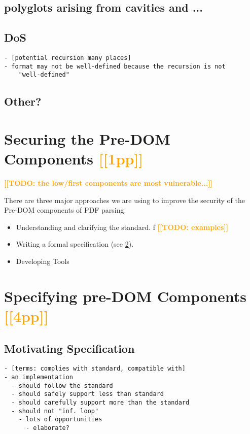 \documentclass[conference,10pt]{IEEEtran}
\newcommand{\note}[1]{\noteYes{#1}}
\newcommand{\noteYes}[1]{\textbf{\textcolor{orange}{[[#1]]}}}
\newcommand{\todo}[1]{\note{TODO: #1}}
\begin{document}
\subsection{polyglots arising from cavities and ...}
\subsection{DoS}
\begin{lstlisting}
- [potential recursion many places]
- format may not be well-defined because the recursion is not
    "well-defined"
\end{lstlisting}

\subsection{Other?}

\section{Securing the Pre-DOM Components \note{1pp}}
\label{sec:securing}

\todo{the low/first components are most vulnerable...}
     
There are three major approaches we are using to improve the security of the
Pre-DOM components of PDF parsing:
\begin{itemize}
   \item Understanding and clarifying the standard. 
f     \todo{examples}
     
   \item Writing a formal specification (see \cref{sec:specifying}).

   \item Developing Tools
\end{itemize}

\section{Specifying pre-DOM Components \note{4pp}}
\label{sec:specifying}
\subsection{Motivating Specification}
\begin{lstlisting}
- [terms: complies with standard, compatible with]
- an implementation
  - should follow the standard
  - should safely support less than standard
  - should carefully support more than the standard
  - should not "inf. loop"
    - lots of opportunities
      - elaborate?
\end{lstlisting}
\end{document}
